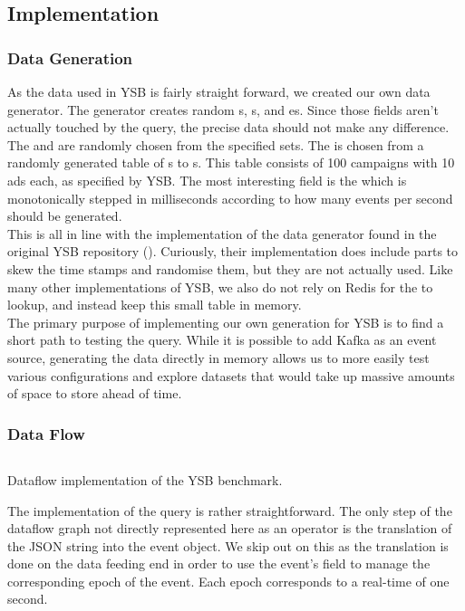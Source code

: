 \subsection{Implementation}
\subsubsection{Data Generation}
As the data used in YSB is fairly straight forward, we created our own data generator. The generator creates random s, s, and es. Since those fields aren't actually touched by the query, the precise data should not make any difference. The  and  are randomly chosen from the specified sets. The  is chosen from a randomly generated table of s to s. This table consists of 100 campaigns with 10 ads each, as specified by YSB. The most interesting field is the  which is monotonically stepped in milliseconds according to how many events per second should be generated. \\

This is all in line with the implementation of the data generator found in the original YSB repository (). Curiously, their implementation does include parts to skew the time stamps and randomise them, but they are not actually used. Like many other implementations of YSB, we also do not rely on Redis for the  to  lookup, and instead keep this small table in memory. \\

The primary purpose of implementing our own generation for YSB is to find a short path to testing the query. While it is possible to add Kafka as an event source, generating the data directly in memory allows us to more easily test various configurations and explore datasets that would take up massive amounts of space to store ahead of time.

\subsubsection{Data Flow}
\begin{listing}[H]
  \inputminted[firstline=82,lastline=92]{rust}{benchmarks/src/ysb.rs}
  \caption{Dataflow implementation of the YSB benchmark.}
  \label{lst:ysb}
\end{listing}

The implementation of the query is rather straightforward. The only step of the dataflow graph not directly represented here as an operator is the translation of the JSON string into the event object. We skip out on this as the translation is done on the data feeding end in order to use the event's  field to manage the corresponding epoch of the event. Each epoch corresponds to a real-time of one second. \\

